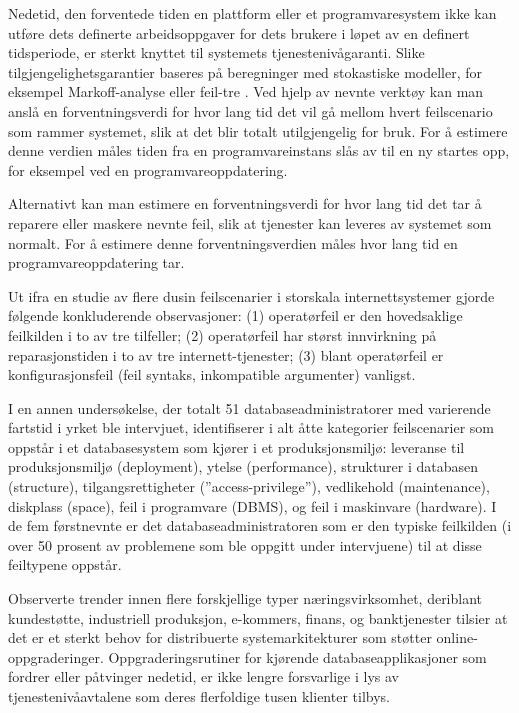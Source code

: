 Nedetid, den forventede tiden en plattform eller et programvaresystem ikke kan utføre dets definerte arbeidsoppgaver for dets brukere i løpet av en definert tidsperiode, er sterkt knyttet til systemets tjenestenivågaranti. Slike tilgjengelighetsgarantier baseres på beregninger med stokastiske modeller, for eksempel Markoff-analyse eller feil-tre \citep{BCK2013}. Ved hjelp av nevnte verktøy kan man anslå en forventningsverdi for hvor lang tid det vil gå mellom hvert feilscenario som rammer systemet, slik at det blir totalt utilgjengelig for bruk. For å estimere denne verdien måles tiden fra en programvareinstans slås av til en ny startes opp, for eksempel ved en programvareoppdatering.

Alternativt kan man estimere en forventningsverdi for hvor lang tid det tar å reparere eller maskere nevnte feil, slik at tjenester kan leveres av systemet som normalt. For å estimere denne forventningsverdien måles hvor lang tid en programvareoppdatering tar.

Ut ifra en studie av flere dusin feilscenarier i storskala internettsystemer gjorde \cite{oppenheimer2003internet} følgende konkluderende observasjoner: (1) operatørfeil er den hovedsaklige feilkilden i to av tre tilfeller; (2) operatørfeil har størst innvirkning på reparasjonstiden i to av tre internett-tjenester; (3) blant operatørfeil er konfigurasjonsfeil (feil syntaks, inkompatible argumenter) vanligst.

I en annen undersøkelse, der totalt 51 databaseadministratorer med varierende fartstid i yrket ble intervjuet, identifiserer \cite{oliveira2006understanding} i alt åtte kategorier feilscenarier som oppstår i et databasesystem som kjører i et produksjonsmiljø: leveranse til produksjonsmiljø (deployment), ytelse (performance), strukturer i databasen (structure), tilgangsrettigheter (''access-privilege''), vedlikehold (maintenance), diskplass (space), feil i programvare (DBMS), og feil i maskinvare (hardware). I de fem førstnevnte er det databaseadministratoren som er den typiske feilkilden (i over 50 prosent av problemene som ble oppgitt under intervjuene) til at disse feiltypene oppstår. %

Observerte trender innen flere forskjellige typer næringsvirksomhet, deriblant kundestøtte, industriell produksjon, e-kommers, finans, og banktjenester \citep{dumitras2010upgrade, choi2009} tilsier at det er et sterkt behov for distribuerte systemarkitekturer som støtter online-oppgraderinger. Oppgraderingsrutiner for kjørende databaseapplikasjoner som fordrer eller påtvinger nedetid, er ikke lengre forsvarlige i lys av tjenestenivåavtalene som deres flerfoldige tusen klienter tilbys.

